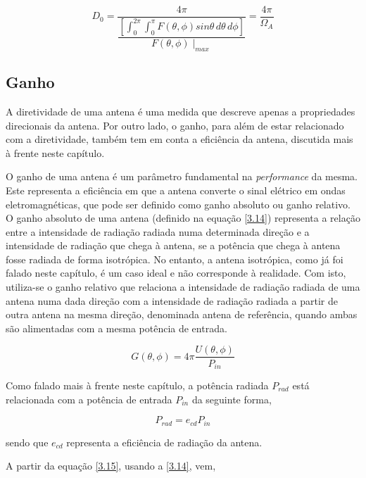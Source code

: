 \begin{equation} \label{3.13}
D_{0}=\dfrac{4\pi}{\dfrac{\left[ \int^{2\pi}_{0}\int^{\pi}_{0}F\left( \theta ,\phi\right) sin\theta\,d\theta \,d\phi\right]}{F\left( \theta ,\phi\right) \mid_{max}} }=\dfrac{4\pi}{\Omega_{A}} 
\end{equation}


\subsection*{Ganho}
A diretividade de uma antena é uma medida que descreve apenas a propriedades direcionais da antena. Por outro lado, o ganho, para além de estar relacionado com a diretividade, também tem em conta a eficiência da antena, discutida mais à frente neste capítulo.\par
O ganho de uma antena é um parâmetro fundamental na \textit{performance} da mesma. Este representa a eficiência em que a antena converte o sinal elétrico em ondas eletromagnéticas, que pode ser definido como ganho absoluto ou ganho relativo. O ganho absoluto de uma antena (definido na equação \ref{3.14}) representa a relação entre a intensidade de radiação radiada numa determinada direção e a intensidade de radiação que chega à antena, se a potência que chega à antena fosse radiada de forma isotrópica. No entanto, a antena isotrópica, como já foi falado neste capítulo, é um caso ideal e não corresponde à realidade. Com isto, utiliza-se o ganho relativo que relaciona a intensidade de radiação radiada de uma antena numa dada direção com a intensidade de radiação radiada a partir de outra antena na mesma direção, denominada antena de referência, quando ambas são alimentadas com a mesma potência de entrada.


\begin{equation} \label{3.14}
G\left( \theta ,\phi\right)=4\pi \dfrac{U\left( \theta ,\phi\right)}{P_{in}}
\end{equation}


Como falado mais à frente neste capítulo, a potência radiada $P_{rad}$ está relacionada com a potência de entrada $P_{in}$ da seguinte forma,

\begin{equation} \label{3.15}
P_{rad}=e_{cd}P_{in}
\end{equation}

sendo que $e_{cd}$ representa a eficiência de radiação da antena. \par 
A partir da equação \ref{3.15}, usando a \ref{3.14}, vem,

